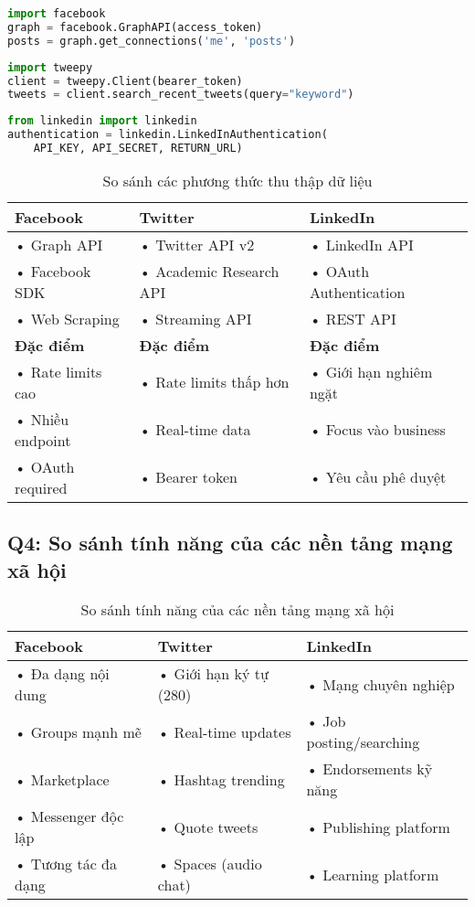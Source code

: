 \documentclass{article}
\begin{document}
\begin{lstlisting}[language=Python, caption=Facebook API]
import facebook
graph = facebook.GraphAPI(access_token)
posts = graph.get_connections('me', 'posts')
\end{lstlisting}

\begin{lstlisting}[language=Python, caption=Twitter API]
import tweepy
client = tweepy.Client(bearer_token)
tweets = client.search_recent_tweets(query="keyword")
\end{lstlisting}

\begin{lstlisting}[language=Python, caption=LinkedIn API]
from linkedin import linkedin
authentication = linkedin.LinkedInAuthentication(
    API_KEY, API_SECRET, RETURN_URL)
\end{lstlisting}

\begin{table}[h!]
\begin{tabularx}{\textwidth}{|X|X|X|}
\hline
\textbf{Facebook} & \textbf{Twitter} & \textbf{LinkedIn} \\
\hline
• Graph API & • Twitter API v2 & • LinkedIn API \\
• Facebook SDK & • Academic Research API & • OAuth Authentication \\
• Web Scraping & • Streaming API & • REST API \\
\hline
\textbf{Đặc điểm} & \textbf{Đặc điểm} & \textbf{Đặc điểm} \\
\hline
• Rate limits cao & • Rate limits thấp hơn & • Giới hạn nghiêm ngặt \\
• Nhiều endpoint & • Real-time data & • Focus vào business \\
• OAuth required & • Bearer token & • Yêu cầu phê duyệt \\
\hline
\end{tabularx}
\caption{So sánh các phương thức thu thập dữ liệu}
\end{table}

\subsection*{Q4: So sánh tính năng của các nền tảng mạng xã hội}

\begin{table}[h!]
\begin{tabularx}{\textwidth}{|X|X|X|}
\hline
\textbf{Facebook} & \textbf{Twitter} & \textbf{LinkedIn} \\
\hline
• Đa dạng nội dung & • Giới hạn ký tự (280) & • Mạng chuyên nghiệp \\
• Groups mạnh mẽ & • Real-time updates & • Job posting/searching \\
• Marketplace & • Hashtag trending & • Endorsements kỹ năng \\
• Messenger độc lập & • Quote tweets & • Publishing platform \\
• Tương tác đa dạng & • Spaces (audio chat) & • Learning platform \\
\hline
\end{tabularx}
\caption{So sánh tính năng của các nền tảng mạng xã hội}
\end{table}
\end{document}
